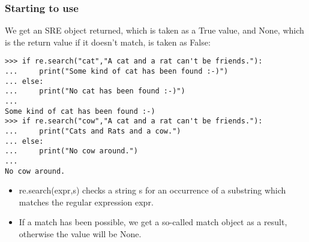  \begin{frame}[fragile]
\frametitle{Starting to use}
We get an SRE object returned, which is taken as a True value, and None, which is the return value if it doesn't match, is taken as False:

\begin{lstlisting}
>>> if re.search("cat","A cat and a rat can't be friends."):
...     print("Some kind of cat has been found :-)")
... else:
...     print("No cat has been found :-)")
... 
Some kind of cat has been found :-)
>>> if re.search("cow","A cat and a rat can't be friends."):
...     print("Cats and Rats and a cow.")
... else:
...     print("No cow around.")
... 
No cow around.
\end{lstlisting}
\begin{itemize}
\item re.search(expr,s) checks a string s for an occurrence of a substring which matches the regular expression expr.
\item If a match has been possible, we get a so-called match object as a result, otherwise the value will be None.
\end{itemize}
\end{frame}
%
%



